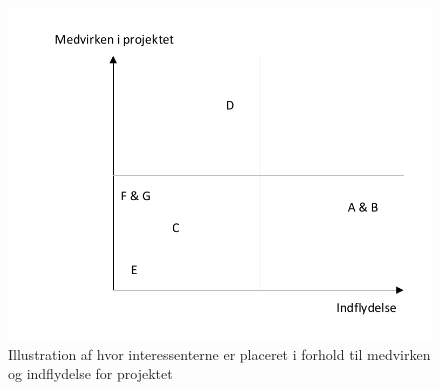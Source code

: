 \begin{figure}[!h]
	\includegraphics[width=1\textwidth]{interessentanalyse.pdf}
	\caption{Illustration af hvor interessenterne er placeret i forhold til medvirken og indflydelse for projektet}
\end{figure}



